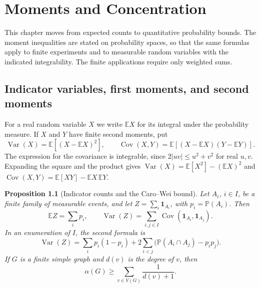 \documentclass[11pt,oneside,openany]{book}
\theoremstyle{plain}
\newtheorem{proposition}[theorem]{Proposition}
\theoremstyle{definition}
\theoremstyle{remark}
\begin{document}
\chapter{Moments and Concentration}
\label{p205:moments}

This chapter moves from expected counts to quantitative probability
bounds. The moment inequalities are stated on probability spaces, so
that the same formulas apply to finite experiments and to measurable
random variables with the indicated integrability. The finite
applications require only weighted sums.

\section{Indicator variables, first moments, and second moments}

For a real random variable \(X\) we write \(\mathbb E X\) for its
integral under the probability measure. If \(X\) and \(Y\) have finite
second moments, put
\[
 \operatorname{Var}(X)=\mathbb E[(X-\mathbb E X)^2],\qquad
 \operatorname{Cov}(X,Y)=
 \mathbb E[(X-\mathbb E X)(Y-\mathbb E Y)] .
\]
The expression for the covariance is integrable, since
\(2|uv|\le u^2+v^2\) for real \(u,v\). Expanding the square and the
product gives
\(\operatorname{Var}(X)=\mathbb E[X^2]-(\mathbb E X)^2\) and
\(\operatorname{Cov}(X,Y)=\mathbb E[XY]-\mathbb E X\,\mathbb E Y\).

\begin{proposition}[Indicator counts and the Caro--Wei bound]
\label{p205:W20}
Let \(A_i\), \(i\in I\), be a finite family of measurable events, and
let \(Z=\sum_i\mathbf 1_{A_i}\), with \(p_i=\mathbb P(A_i)\). Then
\[
 \mathbb E Z=\sum_i p_i,\qquad
 \operatorname{Var}(Z)=
  \sum_{i,j\in I}\operatorname{Cov}(\mathbf 1_{A_i},\mathbf 1_{A_j}).
\]
In an enumeration of \(I\), the second formula is
\[
 \operatorname{Var}(Z)=\sum_i p_i(1-p_i)
   +2\sum_{i<j}\bigl(\mathbb P(A_i\cap A_j)-p_i p_j\bigr).
\]
If \(G\) is a finite simple graph and \(d(v)\) is the degree of \(v\),
then
\[
 \alpha(G)\ge\sum_{v\in V(G)}\frac{1}{d(v)+1}.
\]
\end{proposition}
\end{document}
